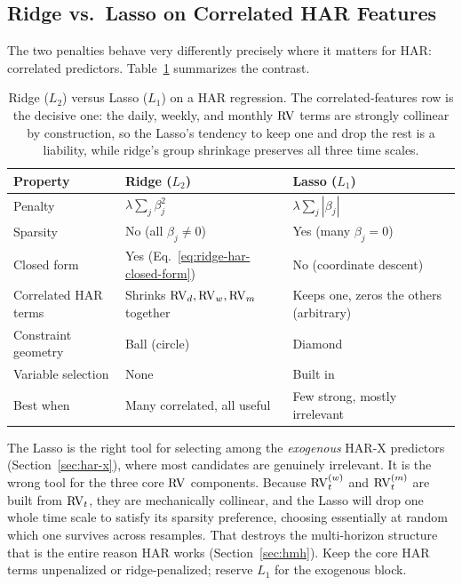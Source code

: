 \subsection{Ridge vs.\ Lasso on Correlated HAR Features}

The two penalties behave very differently precisely where it matters for HAR: correlated predictors.
Table~\ref{tab:ridge-vs-lasso} summarizes the contrast.

\begin{table}[htbp]
\centering
\caption{Ridge ($L_2$) versus Lasso ($L_1$) on a HAR regression.
The correlated-features row is the decisive one: the daily, weekly, and monthly $\operatorname{RV}$ terms are strongly collinear by construction, so the Lasso's tendency to keep one and drop the rest is a liability, while ridge's group shrinkage preserves all three time scales.}
\label{tab:ridge-vs-lasso}
\begin{tabular}{@{} l l l @{}}
\toprule
\textbf{Property} & \textbf{Ridge ($L_2$)} & \textbf{Lasso ($L_1$)} \\
\midrule
Penalty & $\lambda\sum_j \beta_j^2$ & $\lambda\sum_j |\beta_j|$ \\
Sparsity & No (all $\beta_j \neq 0$) & Yes (many $\beta_j = 0$) \\
Closed form & Yes (Eq.~\ref{eq:ridge-har-closed-form}) & No (coordinate descent) \\
Correlated HAR terms & Shrinks $\operatorname{RV}_d,\operatorname{RV}_w,\operatorname{RV}_m$ together & Keeps one, zeros the others (arbitrary) \\
Constraint geometry & Ball (circle) & Diamond \\
Variable selection & None & Built in \\
Best when & Many correlated, all useful & Few strong, mostly irrelevant \\
\bottomrule
\end{tabular}
\end{table}

\begin{warning}
The Lasso is the right tool for selecting among the \emph{exogenous} HAR-X predictors (Section~\ref{sec:har-x}), where most candidates are genuinely irrelevant.
It is the wrong tool for the three core $\operatorname{RV}$ components.
Because $\operatorname{RV}^{(w)}_t$ and $\operatorname{RV}^{(m)}_t$ are built from $\operatorname{RV}_t$, they are mechanically collinear, and the Lasso will drop one whole time scale to satisfy its sparsity preference, choosing essentially at random which one survives across resamples.
That destroys the multi-horizon structure that is the entire reason HAR works (Section~\ref{sec:hmh}).
Keep the core HAR terms unpenalized or ridge-penalized; reserve $L_1$ for the exogenous block.
\end{warning}

